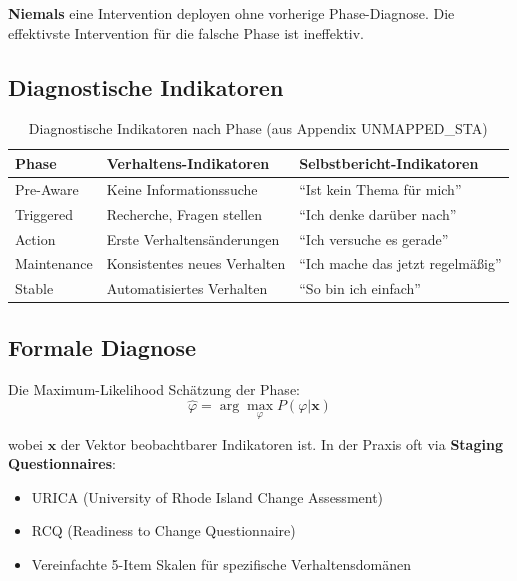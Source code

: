 \begin{tcolorbox}[colback=blue!5!white, colframe=blue!75!black,
    title=Prinzip: Diagnosis Before Intervention]
\textbf{Niemals} eine Intervention deployen ohne vorherige Phase-Diagnose. Die effektivste Intervention für die falsche Phase ist ineffektiv.
\end{tcolorbox}

\subsection{Diagnostische Indikatoren}

\begin{table}[htbp]
\centering
\caption{Diagnostische Indikatoren nach Phase (aus Appendix UNMAPPED_STA)}
\label{tab:18-diagnosis-indicators}
\renewcommand{\arraystretch}{1.4}
\small
\begin{tabular}{@{}lll@{}}
\toprule
\textbf{Phase} & \textbf{Verhaltens-Indikatoren} & \textbf{Selbstbericht-Indikatoren} \\
\midrule
Pre-Aware & Keine Informationssuche & ``Ist kein Thema für mich'' \\
Triggered & Recherche, Fragen stellen & ``Ich denke darüber nach'' \\
Action & Erste Verhaltensänderungen & ``Ich versuche es gerade'' \\
Maintenance & Konsistentes neues Verhalten & ``Ich mache das jetzt regelmäßig'' \\
Stable & Automatisiertes Verhalten & ``So bin ich einfach'' \\
\bottomrule
\end{tabular}
\end{table}

\subsection{Formale Diagnose}

Die Maximum-Likelihood Schätzung der Phase:
\begin{equation}
\hat{\varphi} = \arg\max_{\varphi} P(\varphi | \mathbf{x})
\label{eq:18-phase-mle}
\end{equation}

wobei $\mathbf{x}$ der Vektor beobachtbarer Indikatoren ist. In der Praxis oft via \textbf{Staging Questionnaires}:
\begin{itemize}
\item URICA (University of Rhode Island Change Assessment)
\item RCQ (Readiness to Change Questionnaire)
\item Vereinfachte 5-Item Skalen für spezifische Verhaltensdomänen
\end{itemize}


